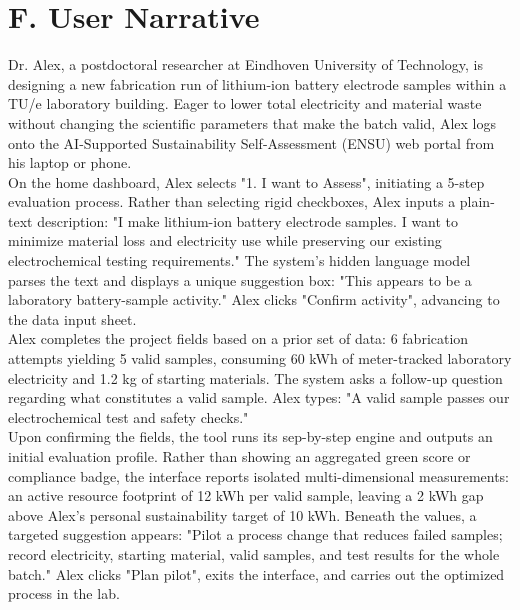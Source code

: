 \documentclass[11pt,a4paper]{article}
\begin{document}
\clearpage
\section*{F. User Narrative}

\noindent Dr. Alex, a postdoctoral researcher at Eindhoven University of Technology, is designing a new fabrication run of lithium-ion battery electrode samples within a TU/e laboratory building. Eager to lower total electricity and material waste without changing the scientific parameters that make the batch valid, Alex logs onto the AI-Supported Sustainability Self-Assessment (ENSU) web portal from his laptop or phone.\\

On the home dashboard, Alex selects "1. I want to Assess", initiating a 5-step evaluation process. Rather than selecting rigid checkboxes, Alex inputs a plain-text description: "I make lithium-ion battery electrode samples. I want to minimize material loss and electricity use while preserving our existing electrochemical testing requirements." The system’s hidden language model parses the text and displays a unique suggestion box: "This appears to be a laboratory battery-sample activity." Alex clicks "Confirm activity", advancing to the data input sheet.\\

Alex completes the project fields based on a prior set of data: 6 fabrication attempts yielding 5 valid samples, consuming 60 kWh of meter-tracked laboratory electricity and 1.2 kg of starting materials. The system asks a follow-up question regarding what constitutes a valid sample. Alex types: "A valid sample passes our electrochemical test and safety checks."\\

Upon confirming the fields, the tool runs its sep-by-step engine and outputs an initial evaluation profile. Rather than showing an aggregated green score or compliance badge, the interface reports isolated multi-dimensional measurements: an active resource footprint of 12 kWh per valid sample, leaving a 2 kWh gap above Alex's personal sustainability target of 10 kWh. Beneath the values, a targeted suggestion appears: "Pilot a process change that reduces failed samples; record electricity, starting material, valid samples, and test results for the whole batch." Alex clicks "Plan pilot", exits the interface, and carries out the optimized process in the lab.\\
\end{document}
